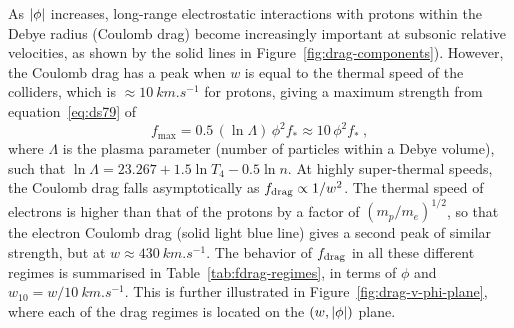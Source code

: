 As \(\lvert\phi\rvert\) increases, long-range electrostatic interactions with
protons within the Debye radius (Coulomb drag) become increasingly
important at subsonic relative velocities, as shown by the solid lines
in Figure~\ref{fig:drag-components}).
However, the Coulomb drag has a peak when \(w\) is equal to the
thermal speed of the colliders, which is
\(\approx \SI{10}{km.s^{-1}}\) for protons, giving a maximum strength from
equation~\eqref{eq:ds79} of
\begin{equation}
  \label{eq:fdrag-maximum}
  f_{\mathrm{max}} = 0.5\, (\ln\Lambda)\, \phi^2 f_* \approx 10\, \phi^2 f_* \ , 
\end{equation}
where \(\Lambda\) is the plasma parameter (number of particles within a
Debye volume), such that
\(\ln\Lambda = 23.267 + 1.5 \ln T_4 - 0.5 \ln n\).  At highly super-thermal
speeds, the Coulomb drag falls asymptotically as
\(f_{\text{drag}} \propto 1 / w^{2}\).  The thermal speed of electrons is higher than
that of the protons by a factor of \((m_p / m_e)^{1/2}\), so that the
electron Coulomb drag (solid light blue line) gives a second peak of
similar strength, but at \(w \approx \SI{430}{km.s^{-1}}\).  The behavior of
\(f_{\text{drag}}\) in all these different regimes is summarised in
Table~\ref{tab:fdrag-regimes}, in terms of \(\phi\) and
\(w_{10} = w / \SI{10}{km.s^{-1}}\).  This is further illustrated in
Figure~\ref{fig:drag-v-phi-plane}, where each of the drag regimes is
located on the \((w, \lvert\phi\rvert)\) plane.



